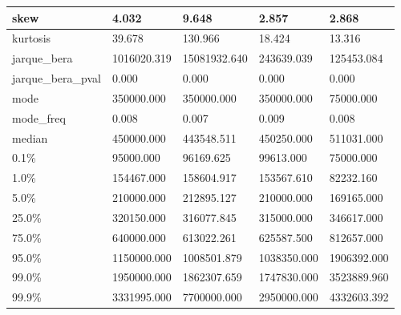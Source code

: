 \begin{table}[H]
\begin{tabular}{|l|m{10em}|m{10em}|m{10em}|m{10em}|}
\hline skew & 4.032 & 9.648 & 2.857 & 2.868 \\
\hline kurtosis & 39.678 & 130.966 & 18.424 & 13.316 \\
\hline jarque\_bera & 1016020.319 & 15081932.640 & 243639.039 & 125453.084 \\
\hline jarque\_bera\_pval & 0.000 & 0.000 & 0.000 & 0.000 \\
\hline mode & 350000.000 & 350000.000 & 350000.000 & 75000.000 \\
\hline mode\_freq & 0.008 & 0.007 & 0.009 & 0.008 \\
\hline median & 450000.000 & 443548.511 & 450250.000 & 511031.000 \\
\hline 0.1\% & 95000.000 & 96169.625 & 99613.000 & 75000.000 \\
\hline 1.0\% & 154467.000 & 158604.917 & 153567.610 & 82232.160 \\
\hline 5.0\% & 210000.000 & 212895.127 & 210000.000 & 169165.000 \\
\hline 25.0\% & 320150.000 & 316077.845 & 315000.000 & 346617.000 \\
\hline 75.0\% & 640000.000 & 613022.261 & 625587.500 & 812657.000 \\
\hline 95.0\% & 1150000.000 & 1008501.879 & 1038350.000 & 1906392.000 \\
\hline 99.0\% & 1950000.000 & 1862307.659 & 1747830.000 & 3523889.960 \\
\hline 99.9\% & 3331995.000 & 7700000.000 & 2950000.000 & 4332603.392 \\
\hline
\end{tabular}
\end{table}
